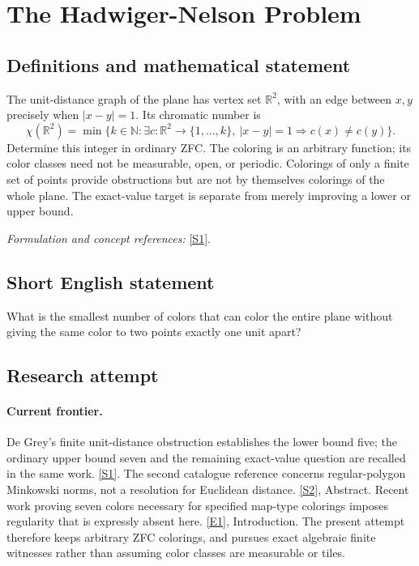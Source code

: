 \documentclass[11pt,a4paper]{article}
\newcommand{\N}{\mathbb{N}}
\newcommand{\R}{\mathbb{R}}
\newcommand{\sref}[2]{\hyperlink{source:#1:#2}{[S#2]}}
\newcommand{\eref}[2]{\hyperlink{extra:#1:#2}{[E#2]}}
\newif\ifshowcatalogue
\newcommand{\cataloguescope}[1]{\ifshowcatalogue
 \paragraph{Exact scope in the supplied catalogue.}
 \begin{quote}\small #1\end{quote}\fi}
\numberwithin{equation}{section}
\begin{document}
\setcounter{section}{0}
\clearpage
\section*{\texorpdfstring{The Hadwiger-Nelson Problem}{The Hadwiger-Nelson Problem}}\label{statement}
\subsection{Definitions and mathematical statement}
The unit-distance graph of the plane has vertex set $\R^2$, with an edge between $x,y$ precisely when $|x-y|=1$. Its chromatic number is
\[
 \chi(\R^2)=\min\{k\in\N:\exists c:\R^2\to\{1,\ldots,k\},
 \ |x-y|=1\Rightarrow c(x)\ne c(y)\}.
\]
Determine this integer in ordinary ZFC. The coloring is an arbitrary function; its color classes need not be measurable, open, or periodic. Colorings of only a finite set of points provide obstructions but are not by themselves colorings of the whole plane. The exact-value target is separate from merely improving a lower or upper bound.
\par\smallskip\textit{Formulation and concept references:} \sref{statement}{1}.
\cataloguescope{Determine the chromatic number of the Euclidean plane: the minimum number of colours needed to colour every point so that points at distance exactly one have distinct colours, with ordinary arbitrary colourings in ZFC and no measurability requirement.}
\subsection{Short English statement}
What is the smallest number of colors that can color the entire plane without giving the same color to two points exactly one unit apart?
\subsection{Research attempt}

\paragraph{Current frontier.}
De Grey's finite unit-distance obstruction establishes the lower bound
five; the ordinary upper bound seven and the remaining exact-value
question are recalled in the same work. \sref{statement}{1}.
The second catalogue reference concerns regular-polygon Minkowski norms,
not a resolution for Euclidean distance. \sref{statement}{2}, Abstract.
Recent work proving seven colors necessary for specified map-type
colorings imposes regularity that is expressly absent here.
\eref{statement}{1}, Introduction. The present attempt therefore keeps arbitrary
ZFC colorings, and pursues exact algebraic finite witnesses rather than
assuming color classes are measurable or tiles.
\end{document}
